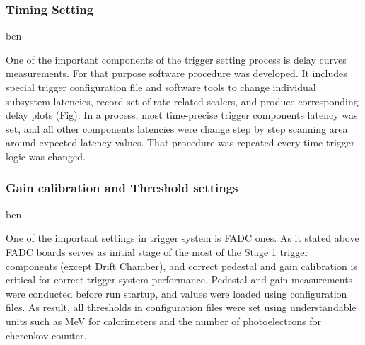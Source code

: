 \subsubsection{Timing Setting} ben

One of the important components of the trigger setting process is delay curves measurements. For that purpose software procedure was developed. It includes special trigger configuration file and software tools to change individual subsystem latencies, record set of rate-related scalers, and produce corresponding delay plots (Fig). In a process, most time-precise trigger components latency was set, and all other components latencies were change step by step scanning area around expected latency values. That procedure was repeated every time trigger logic was changed.


\subsubsection{Gain calibration and Threshold settings} ben

One of the important settings in trigger system is FADC ones. As it stated above FADC boards serves as initial stage of the most of the Stage 1 trigger components (except Drift Chamber), and correct pedestal and gain calibration is critical for correct trigger system performance. Pedestal and gain measurements were conducted before run startup, and values were loaded using configuration files. As result, all thresholds in configuration files were set using understandable units such as MeV for calorimeters and the number of photoelectrons for cherenkov counter.
